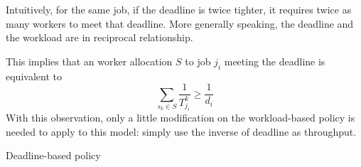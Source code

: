 Intuitively, for the same job, if the deadline is twice tighter, it
requires twice as many workers to meet that deadline.
More generally speaking, the deadline and the workload are in reciprocal
relationship.

This implies that an worker allocation $S$ to job $j_i$ meeting the
deadline is equivalent to
\[\displaystyle\sum_{s_k \in S}\frac{1}{T^k_{j_i}} \geq \frac{1}{d_i}\]
With this observation, only a little modification on the workload-based
policy is needed to apply to this model: simply use the inverse of
deadline as throughput.

\begin{algorithm}[H]
  \DontPrintSemicolon %
  
  \caption{Deadline-based policy}
  \label{algo:deadline-based}
\end{algorithm}
